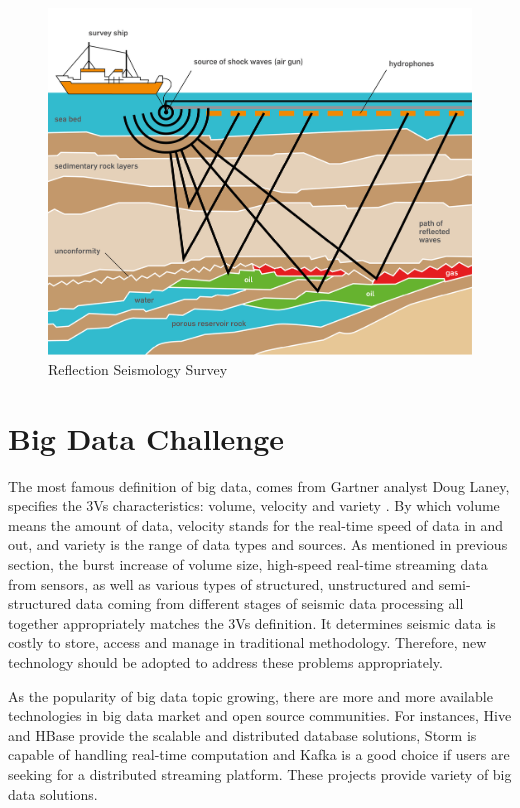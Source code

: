 \begin{figure}[h]
\centering
\includegraphics[scale=0.9]{figures/Seissurvey.jpg}
\caption{Reflection Seismology Survey \cite{seisaov}}
\label{seismic_reflection}
\end{figure}

\section{Big Data Challenge}

The most famous definition of big data, comes from Gartner analyst Doug Laney, specifies the 3Vs characteristics: volume, velocity and variety \cite{demauro2016}. By which volume means the amount of data, velocity stands for the real-time speed of data in and out, and variety is the range of data types and sources. As mentioned in previous section,  the burst increase of volume size, high-speed real-time streaming data from sensors, as well as various types of structured, unstructured and semi-structured data coming from different stages of seismic data processing all together appropriately matches the 3Vs definition. It determines seismic data is costly to store, access and manage in traditional methodology. Therefore, new technology should be adopted to address these problems appropriately.

As the popularity of big data topic growing, there are more and more available technologies in big data market and open source communities. For instances,  Hive and HBase provide the scalable and distributed database solutions, Storm is capable of handling real-time computation and Kafka is a good choice if users are seeking for a distributed streaming platform. These projects provide variety of big data solutions. 


